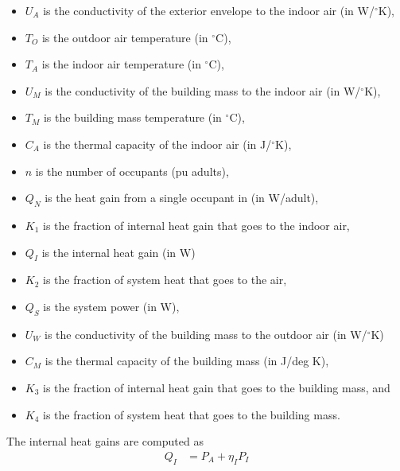\documentclass[12pt,letterpaper,twoside]{article}
\newcommand{\eq}[1]{\begin{align*}#1\end{align*}}
\renewcommand{\deg}[1]{$^\circ$#1}
\begin{document}
\begin{itemize}

\item $U_A$ is the conductivity of the exterior envelope to the indoor air (in W/\deg K),

\item $T_O$ is the outdoor air temperature (in \deg C),

\item $T_A$ is the indoor air temperature (in \deg C),

\item $U_M$ is the conductivity of the building mass to the indoor air (in W/\deg K),

\item $T_M$ is the building mass temperature (in \deg C),

\item $C_A$ is the thermal capacity of the indoor air (in J/\deg K),

\item $n$ is the number of occupants (pu adults),

\item $Q_N$ is the heat gain from a single occupant in (in W/adult), 

\item $K_1$ is the fraction of internal heat gain that goes to the indoor air,

\item $Q_I$ is the internal heat gain (in W)

\item $K_2$ is the fraction of system heat that goes to the air,

\item $Q_S$ is the system power (in W),

\item $U_W$ is the conductivity of the building mass to the outdoor air (in W/\deg K)

\item $C_M$ is the thermal capacity of the building mass (in J/deg K), 

\item $K_3$ is the fraction of internal heat gain that goes to the building mass, and

\item $K_4$ is the fraction of system heat that goes to the building mass.

\end{itemize}
The internal heat gains are computed as 
\eq 
{
	Q_I &= P_A + \eta_I P_I
}
\end{document}
